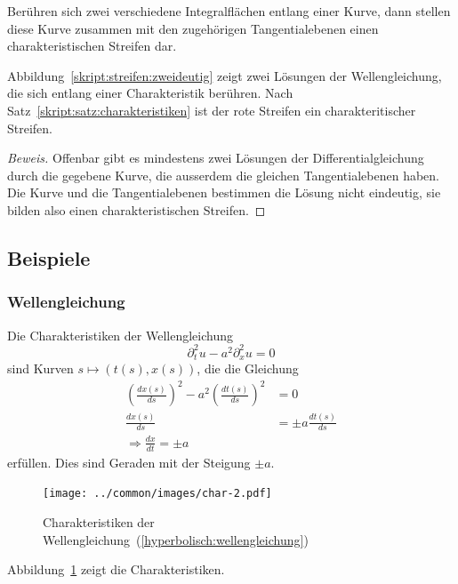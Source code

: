 \begin{satz}
\label{skript:satz:charakteristiken}
Berühren sich zwei verschiedene Integralflächen entlang einer
Kurve, dann stellen diese Kurve zusammen mit den zugehörigen Tangentialebenen
einen charakteristischen Streifen dar.
\end{satz}

Abbildung~\ref{skript:streifen:zweideutig} zeigt zwei Lösungen der
Wellengleichung, die sich entlang einer Charakteristik berühren.
Nach Satz~\ref{skript:satz:charakteristiken} ist der rote Streifen ein
charakteritischer Streifen.

\begin{proof}[Beweis]
Offenbar gibt es mindestens zwei Lösungen der Differentialgleichung
durch die gegebene Kurve, die ausserdem die gleichen Tangentialebenen
haben. Die Kurve und die Tangentialebenen bestimmen die Lösung nicht
eindeutig, sie bilden also einen charakteristischen Streifen.
\end{proof}

\subsection{Beispiele}
\subsubsection{Wellengleichung}
Die Charakteristiken der Wellengleichung
\begin{equation}
\partial_t^2u-a^2\partial_x^2u=0
\label{hyperbolisch:wellengleichung}
\end{equation}
sind Kurven $s\mapsto(t(s),x(s))$, die die Gleichung
\begin{align*}
\left(
\frac{dx(s)}{ds}\right)^2-a^2\left(\frac{dt(s)}{ds}\right)^2&=0
\\
\frac{dx(s)}{ds}
&=
\pm a\frac{dt(s)}{ds}
\\
\Rightarrow
\frac{dx}{dt}=\pm a
\end{align*}
erfüllen. Dies sind Geraden mit der Steigung $\pm a$.
\begin{figure}
\begin{center}
\texttt{[image: ../common/images/char-2.pdf]}
\end{center}
\caption{Charakteristiken der
Wellengleichung~(\ref{hyperbolisch:wellengleichung})
\label{hyp:wellen}}
\end{figure}
Abbildung~\ref{hyp:wellen} zeigt die Charakteristiken.

